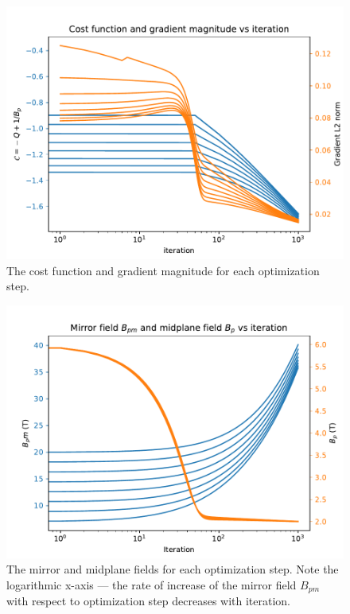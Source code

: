 \begin{figure}
    \centering
    \includegraphics[scale=0.6]{opt_figures/simple_Q_cost_paper.pdf}
    \caption[Simple mirror: cost function and gradient magnitude for each step]{The cost function and gradient magnitude for each optimization step.}
    \label{fig:simple_Q_opt}
\end{figure}

\begin{figure}
    \centering
    \includegraphics[scale=0.6]{opt_figures/mirror_field_iteration_paper.pdf}
    \caption[Simple mirror: magnetic fields for each step]{The mirror and midplane fields for each optimization step. Note the logarithmic x-axis — the rate of increase of the mirror field $B_{pm}$ with respect to optimization step decreases with iteration.}
    \label{fig:simple_Q_fields}
\end{figure}

